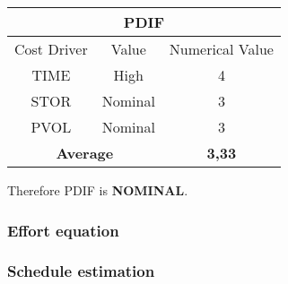\begin{longtable}{ccc}
\multicolumn{3}{c}{\textbf{PDIF}}\\
\toprule
Cost Driver&Value&Numerical Value\\
\midrule
TIME&High&4\\
STOR&Nominal&3\\
PVOL&Nominal&3\\
\midrule
\multicolumn{2}{c}{\textbf{Average}}&\textbf{3,33}\\
\bottomrule
\end{longtable}

Therefore PDIF is \textbf{NOMINAL}.

\subsubsection{Effort equation}

\subsubsection{Schedule estimation }